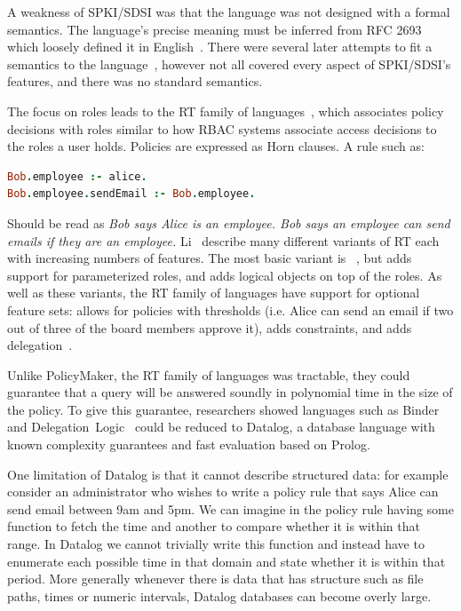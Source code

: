 \documentclass[thesis.tex]{subfiles}
\begin{document}
A weakness of SPKI/SDSI was that the language was not designed
with a formal semantics.  The language's precise meaning must be inferred from
RFC 2693 which loosely defined it in English~\cite{ellison_spki_1999}. There were
several later attempts to fit a semantics to the
language~\cite{joseph_y._halpern_logic_1999,abadi_sdsis_1998,howell_formal_2000,dwaine_clarke_certificate_2001},
however not all covered every aspect of SPKI/SDSI's features, and there was no standard semantics.

The focus on roles leads to the RT family of
languages~\cite{ninghui_li_design_2002}, which associates policy
decisions with roles similar to how \ac{RBAC} systems associate access
decisions to the roles a user holds.  Policies are expressed as Horn
clauses.  A rule such as:

\begin{lstlisting}[language=prolog]
Bob.employee :- alice.
Bob.employee.sendEmail :- Bob.employee.
\end{lstlisting}

Should be read as \emph{Bob says Alice is an employee.  Bob says an
employee can send emails if they are an employee.}  Li~\etal{}
describe many different variants of RT each with increasing numbers of
features.  The most basic variant is
~\cite{li_distributed_2003}, but  adds support for
parameterized roles, and  adds logical objects on top of the
roles.  As well as these variants, the RT family of languages have
support for optional feature sets:  allows for policies with
thresholds (i.e. Alice can send an email if two out of three of the
board members approve it),  adds constraints, and 
adds delegation~\cite{ninghui_li_design_2002}.

Unlike PolicyMaker, the RT family of languages was tractable, they could
guarantee that a query will be answered soundly in polynomial time in the size
of the policy. To give this guarantee, researchers showed languages such as
Binder~\cite{detreville_binder_2002} and
Delegation~Logic~\cite{li_delegation_2003,li_practically_2000} could be reduced
to Datalog, a database language with known complexity guarantees and fast
evaluation based on Prolog.

One limitation of Datalog is that it cannot describe structured data: for
example consider an administrator who wishes to write a policy rule that says
Alice can send email between 9am and 5pm. We can imagine in the policy rule
having some function to fetch the time and another to compare whether it is
within that range. In Datalog we cannot trivially write this function and
instead have to enumerate each possible time in that domain and state whether it
is within that period. More generally whenever there is data that has structure
such as file paths, times or numeric intervals, Datalog databases can become
overly large.
\end{document}
